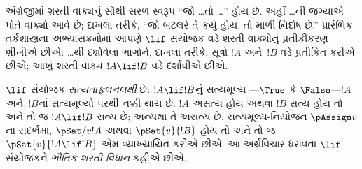 
\label{guunit:OLP-0516}


\begingroup
\makeatletter{}\makeatother

\label{guunit:OLP-0517}


\begingroup
\makeatletter{}\makeatother


\label{guunit:OLP-0518}


અંગ્રેજીમાં શરતી વાક્યનું સૌથી સરળ સ્વરૂપ ``જો \dots તો \dots''
હોય છે. અહીં \dots{}ની જગ્યાએ પોતે વાક્યો આવે છે; દાખલા તરીકે,
``જો બટલરે તે કર્યું હોય, તો માળી નિર્દોષ છે.'' પ્રારંભિક તર્કશાસ્ત્રના
અભ્યાસક્રમોમાં આપણે $\lif$ સંયોજક વડે શરતી વાક્યોનું પ્રતીકીકરણ
શીખીએ છીએ: \dots{}થી દર્શાવેલા ભાગોને, દાખલા તરીકે, સૂત્રો
$!A$ અને~$!B$ વડે પ્રતીકિત કરીએ છીએ; આખું શરતી વાક્ય
$!A \lif !B$ વડે દર્શાવીએ છીએ.

$\lif$ સંયોજક \emph{સત્યતાફલનલક્ષી} છે: $!A \lif !B$નું સત્યમૂલ્ય
---$\True$ કે $\False$---$!A$ અને~$!B$નાં સત્યમૂલ્યો પરથી નક્કી
થાય છે. $!A$ અસત્ય હોય અથવા $!B$ સત્ય હોય તો અને તો જ
$!A \lif !B$ સત્ય છે; અન્યથા તે અસત્ય છે. સત્યમૂલ્ય-નિયોજન
$\pAssign v$ના સંદર્ભમાં, $\pSat/{v}{!A}$ અથવા $\pSat{v}{!B}$ હોય
તો અને તો જ $\pSat{v}{!A \lif !B}$ એમ વ્યાખ્યાયિત કરીએ છીએ. આ
અર્થવિચાર ધરાવતા $\lif$ સંયોજકને \emph{ભૌતિક શરતી વિધાન} કહીએ છીએ.

